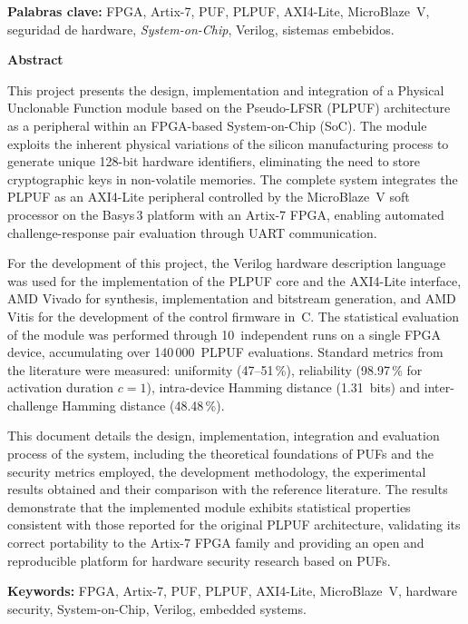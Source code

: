 \vspace{1cm}

\noindent\textbf{Palabras clave:} FPGA, Artix-7, PUF, PLPUF, AXI4-Lite,
MicroBlaze~V, seguridad de hardware, \textit{System-on-Chip}, Verilog,
sistemas embebidos.

\cleardoublepage

\begin{center}
  \vspace*{1.5cm}
  {\Huge\bfseries Abstract}
\end{center}

\vspace{1.5cm}

This project presents the design, implementation and integration of a
Physical Unclonable Function module based on the Pseudo-LFSR (PLPUF)
architecture as a peripheral within an FPGA-based System-on-Chip (SoC). The
module exploits the inherent physical variations of the silicon manufacturing
process to generate unique 128-bit hardware identifiers, eliminating the need
to store cryptographic keys in non-volatile memories. The complete system
integrates the PLPUF as an AXI4-Lite peripheral controlled by the
MicroBlaze~V soft processor on the Basys\,3 platform with an Artix-7 FPGA,
enabling automated challenge-response pair evaluation through UART
communication.

For the development of this project, the Verilog hardware description
language was used for the implementation of the PLPUF core and the AXI4-Lite
interface, AMD Vivado for synthesis, implementation and bitstream
generation, and AMD Vitis for the development of the control firmware in~C.
The statistical evaluation of the module was performed through
10~independent runs on a single FPGA device, accumulating over
140\,000~PLPUF evaluations. Standard metrics from the literature were
measured: uniformity (47--51\,\%), reliability (98.97\,\% for activation
duration $c = 1$), intra-device Hamming distance (1.31~bits) and
inter-challenge Hamming distance (48.48\,\%).

This document details the design, implementation, integration and evaluation
process of the system, including the theoretical foundations of PUFs and the
security metrics employed, the development methodology, the experimental
results obtained and their comparison with the reference literature. The
results demonstrate that the implemented module exhibits statistical
properties consistent with those reported for the original PLPUF
architecture, validating its correct portability to the Artix-7 FPGA family
and providing an open and reproducible platform for hardware security
research based on PUFs.

\vspace{1cm}

\noindent\textbf{Keywords:} FPGA, Artix-7, PUF, PLPUF, AXI4-Lite,
MicroBlaze~V, hardware security, System-on-Chip, Verilog, embedded systems.

\cleardoublepage

